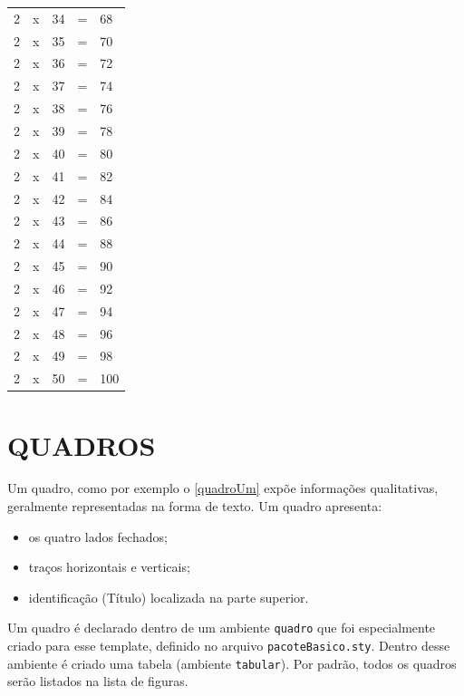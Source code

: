 \documentclass[
  12pt,		%
  a4paper,	%
  openright,%
  oneside,	%
  chapter=TITLE,		%
  section=TITLE,		%
  english,	%
  french,	%
  spanish,	%
  brazil
]{abntex2}
\begin{document}
\begin{longtable}{p{}p{}p{}p{}p{}}
                2 & x & 34 & = & 68  \\
                2 & x & 35 & = & 70  \\
                2 & x & 36 & = & 72  \\
                2 & x & 37 & = & 74  \\
                2 & x & 38 & = & 76  \\
                2 & x & 39 & = & 78  \\
                2 & x & 40 & = & 80  \\
                2 & x & 41 & = & 82  \\
                2 & x & 42 & = & 84  \\
                2 & x & 43 & = & 86  \\
                2 & x & 44 & = & 88  \\
                2 & x & 45 & = & 90  \\
                2 & x & 46 & = & 92  \\
                2 & x & 47 & = & 94  \\
                2 & x & 48 & = & 96  \\
                2 & x & 49 & = & 98  \\
                2 & x & 50 & = & 100 \\
                
            \end{longtable}
            \normalsize %
         
         \section{QUADROS}
         
          Um quadro, como por exemplo o \ref{quadroUm} expõe informações qualitativas, geralmente representadas na forma de texto. Um quadro apresenta:
                
                \begin{itemize}
                    \item os quatro lados fechados;
                    \item traços horizontais e verticais;
                    \item identificação (Título) localizada na parte superior.
                \end{itemize}
                
                Um quadro é declarado dentro de um ambiente \verb|quadro| que foi especialmente criado para esse template, definido no arquivo \verb|pacoteBasico.sty|. Dentro desse ambiente é criado uma tabela (ambiente \verb|tabular|). Por padrão, todos os quadros serão listados na lista de figuras.
                
\end{document}

